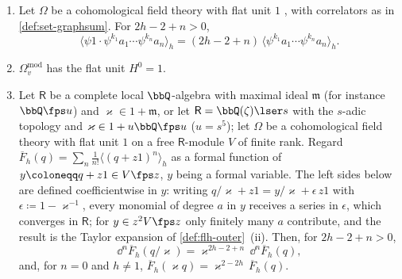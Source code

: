 
\begin{lem}
\label{lem:set-dilaton}
\begin{enumerate}
\item Let $\Omega$ be a cohomological field theory with flat unit $1$ \cite[Def.~0.3~(i)--(iii)]{PPZ15}, with correlators as in \cref{def:set-graphsum}. For $2h-2+n>0$,
\[
\langle\psi1\cdot\psi^{k_1}a_1\cdots\psi^{k_n}a_n\rangle_h=(2h-2+n)\,\langle\psi^{k_1}a_1\cdots\psi^{k_n}a_n\rangle_h .
\]
\item $\Omega^{\mathrm{mod}}_v$ has the flat unit $H^0=1$.
\item Let $\mathsf R$ be a complete local $\bbQ$-algebra with maximal ideal $\mathfrak m$ (for instance $\bbQ\fps u$) and $\varkappa\in1+\mathfrak m$, or let $\mathsf R=\bbQ(\zeta)\lser s$ with the $s$-adic topology and $\varkappa\in1+u\bbQ\fps u$ ($u=s^5$); let $\Omega$ be a cohomological field theory with flat unit $1$ on a free $\mathsf R$-module $V$ of finite rank. Regard $\overline F_h(q)=\sum_n\frac1{n!}\langle(q+z1)^n\rangle_h$ as a formal function of $y\coloneqq q+z1\in V\fps z$, $y$ being a formal variable. The left sides below are defined coefficientwise in $y$: writing $q/\varkappa+z1=y/\varkappa+\epsilon\,z1$ with $\epsilon\coloneqq1-\varkappa^{-1}$, every monomial of degree $a$ in $y$ receives a series in $\epsilon$, which converges in $\mathsf R$; for $y\in z^2V\fps z$ only finitely many $a$ contribute, and the result is the Taylor expansion of \cref{def:flh-outer}~(ii). Then, for $2h-2+n>0$,
\[
\dd^n\overline F_h(q/\varkappa)=\varkappa^{2h-2+n}\,\dd^n\overline F_h(q),
\]
and, for $n=0$ and $h\neq1$, $\overline F_h(\varkappa q)=\varkappa^{2-2h}\,\overline F_h(q)$.
\end{enumerate}
\end{lem}

